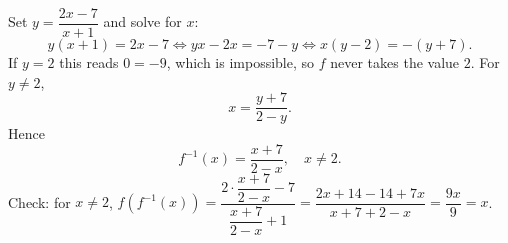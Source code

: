 Set $y=\dfrac{2x-7}{x+1}$ and solve for $x$:
\[y(x+1)=2x-7\iff yx-2x=-7-y\iff x(y-2)=-(y+7).\]
If $y=2$ this reads $0=-9$, which is impossible, so $f$ never takes the value $2$. For $y\ne2$,
\[x=\dfrac{y+7}{2-y}.\]
Hence
\[\boxed{f^{-1}(x)=\dfrac{x+7}{2-x},\quad x\ne2.}\]
Check: for $x\ne2$, $f\left(f^{-1}(x)\right)=\dfrac{2\cdot\dfrac{x+7}{2-x}-7}{\dfrac{x+7}{2-x}+1}=\dfrac{2x+14-14+7x}{x+7+2-x}=\dfrac{9x}{9}=x$.
